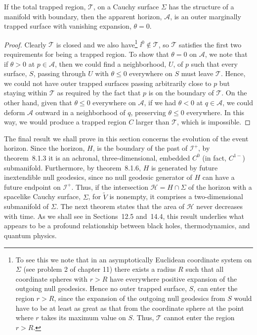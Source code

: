 \begin{theorem}\label{thm:12.2.5}
If the total trapped region, \(\mathcal T\), on a Cauchy surface \(\Sigma\) has the
structure of a manifold with boundary, then the apparent horizon, \(\mathcal A\), is
an outer marginally trapped surface with vanishing expansion, \(\theta=0\).
\end{theorem}
\begin{proof}
Clearly \(\mathcal T\) is closed and we also have\footnote{To see this we note that in
an asymptotically Euclidean coordinate system on \(\Sigma\) (see problem 2 of
chapter 11) there exists a radius \(R\) such that all coordinate spheres with
\(r>R\) have everywhere positive expansion of the outgoing null geodesics. Hence no
outer trapped surface, \(S\), can enter the region \(r>R\), since the expansion of the
outgoing null geodesics from \(S\) would have to be at least as great as that from the
coordinate sphere at the point where \(r\) takes its maximum value on \(S\). Thus,
\(\mathcal T\) cannot enter the region \(r>R\).} \(\ii^0\notin\mathcal T\), so
\(\mathcal T\) satisfies the first two requirements for being a trapped region. To show
that \(\theta=0\) on \(\mathcal A\), we note that if \(\theta>0\) at
\(p\in\mathcal A\), then we could find a neighborhood, \(U\), of \(p\) such that
every surface, \(S\), passing through \(U\) with \(\theta\le0\) everywhere on \(S\)
must leave \(\mathcal T\). Hence, we could not have outer trapped surfaces passing
arbitrarily close to \(p\) but staying within \(\mathcal T\) as required by the fact
that \(p\) is on the boundary of \(\mathcal T\). On the other hand, given that
\(\theta\le0\) everywhere on \(\mathcal A\), if we had \(\theta<0\) at
\(q\in\mathcal A\), we could deform \(\mathcal A\) outward in a neighborhood of
\(q\), preserving \(\theta\le0\) everywhere. In this way, we would produce a
trapped region \(C\) larger than \(\mathcal T\), which is impossible.
\end{proof}

The final result we shall prove in this section concerns the evolution of the event
horizon. Since the horizon, \(H\), is the boundary of the past of \(\mathcal I^+\), by
theorem~8.1.3 it is an achronal, three-dimensional, embedded \(C^0\) (in fact,
\(C^{1-}\)) submanifold. Furthermore, by theorem~8.1.6, \(H\) is generated by
future inextendible null geodesics, since no null geodesic generator of \(H\) can
have a future endpoint on \(\mathcal I^+\). Thus, if the intersection
\(\mathcal H=H\cap\Sigma\) of the horizon with a spacelike Cauchy surface,
\(\Sigma\), for \(\widetilde V\) is nonempty, it comprises a two-dimensional
submanifold of \(\Sigma\). The next theorem states that the area of \(\mathcal H\)
never decreases with time. As we shall see in Sections~12.5 and~14.4, this result
underlies what appears to be a profound relationship between black holes,
thermodynamics, and quantum physics.

